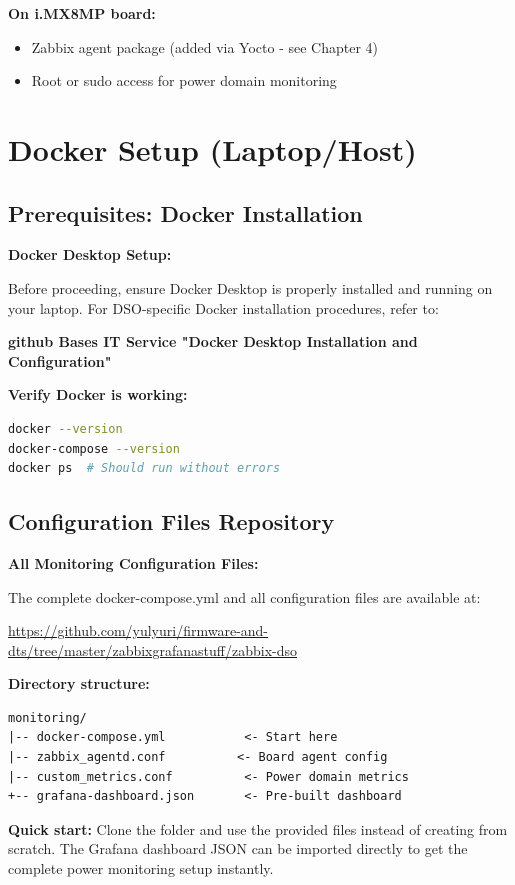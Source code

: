 \documentclass[12pt,a4paper]{report}
\begin{document}
\textbf{On i.MX8MP board:}
\begin{itemize}
    \item Zabbix agent package (added via Yocto - see Chapter 4)
    \item Root or sudo access for power domain monitoring
\end{itemize}

\section{Docker Setup (Laptop/Host)}

\subsection{Prerequisites: Docker Installation}

\begin{docref}
\textbf{Docker Desktop Setup:}

Before proceeding, ensure Docker Desktop is properly installed and running on your laptop. For DSO-specific Docker installation procedures, refer to:

\textbf{github Bases  IT Service  "Docker Desktop Installation and Configuration"}

\textbf{Verify Docker is working:}
\begin{lstlisting}[language=bash]
docker --version
docker-compose --version
docker ps  # Should run without errors
\end{lstlisting}
\end{docref}

\subsection{Configuration Files Repository}

\begin{gitref}
\textbf{All Monitoring Configuration Files:}

The complete docker-compose.yml and all configuration files are available at:

\url{https://github.com/yulyuri/firmware-and-dts/tree/master/zabbixgrafanastuff/zabbix-dso}

\textbf{Directory structure:}
\begin{verbatim}
monitoring/
|-- docker-compose.yml           <- Start here
|-- zabbix_agentd.conf          <- Board agent config
|-- custom_metrics.conf          <- Power domain metrics
+-- grafana-dashboard.json       <- Pre-built dashboard
\end{verbatim}

\textbf{Quick start:} Clone the folder and use the provided files instead of creating from scratch. The Grafana dashboard JSON can be imported directly to get the complete power monitoring setup instantly.
\end{gitref}
\end{document}

